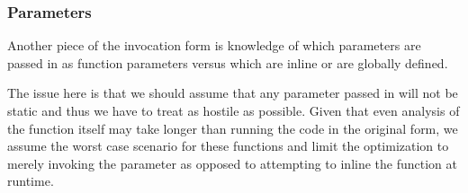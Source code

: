 \subsubsection{Parameters}
Another piece of the invocation form is knowledge of which parameters are passed in as function parameters versus which are inline or are globally defined.

The issue here is that we should assume that any parameter passed in will not be static and thus we have to treat as hostile as possible.  Given that even analysis of the function itself may take longer than running the code in the original form, we assume the worst case scenario for these functions and limit the optimization to merely invoking the parameter as opposed to attempting to inline the function at runtime.